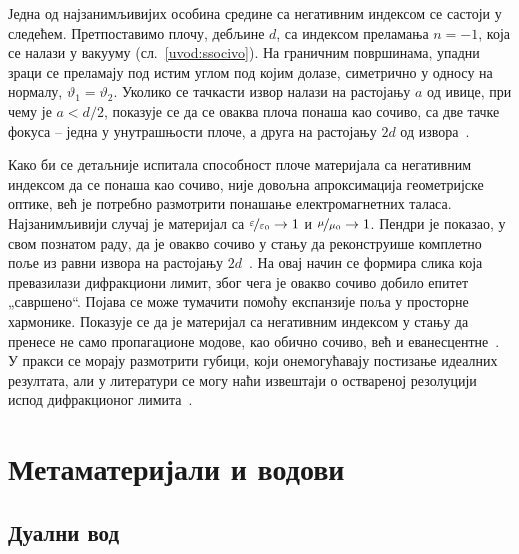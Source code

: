 \documentclass[main.tex]{subfiles}
\begin{document}
Једна од најзанимљивијих особина средине са негативним индексом се састоји у следећем. Претпоставимо плочу, дебљине $d$, са индексом преламања $n=-1$, која се налази у вакууму (сл.~\ref{uvod:ssocivo}). На граничним површинама, упадни зраци се преламају под истим углом под којим долазе, симетрично у односу на нормалу, $\vartheta_1 = \vartheta_2$. Уколико се тачкасти извор налази на растојању $a$ од ивице, при чему је $a<d/2$, показује се да се оваква плоча понаша као сочиво, са две тачке фокуса -- једна у унутрашњости плоче, а друга на растојању $2d$ од извора~\cite{veselago_cir}.

Како би се детаљније испитала способност плоче материјала са негативним индексом да се понаша као сочиво, није довољна апроксимација геометријске оптике, већ је потребно размотрити понашање електромагнетних таласа. Најзанимљивији случај је материјал са $\nicefrac{\varepsilon}{\varepsilon_0}\to 1$ и $\nicefrac{\mu}{\mu_0}\to 1$. Пендри је показао, у свом познатом раду, да је овакво сочиво у стању да реконструише комплетно поље из равни извора на растојању $2d$~\cite{pendry3}. На овај начин се формира слика која превазилази дифракциони лимит, због чега је овакво сочиво добило епитет „савршено``. Појава се може тумачити помоћу експанзије поља у просторне хармонике. Показује се да је материјал са негативним индексом у стању да пренесе не само пропагационе модове, као обично сочиво, већ и еванесцентне~\cite{markes_knjiga}. У пракси се морају размотрити губици, који онемогућавају постизање идеалних резултата, али у литератури се могу наћи извештаји о оствареној резолуцији испод дифракционог лимита~\cite{grbic2004overcoming}.

\section{Метаматеријали и водови}

\subsection{Дуални вод}
\end{document}
